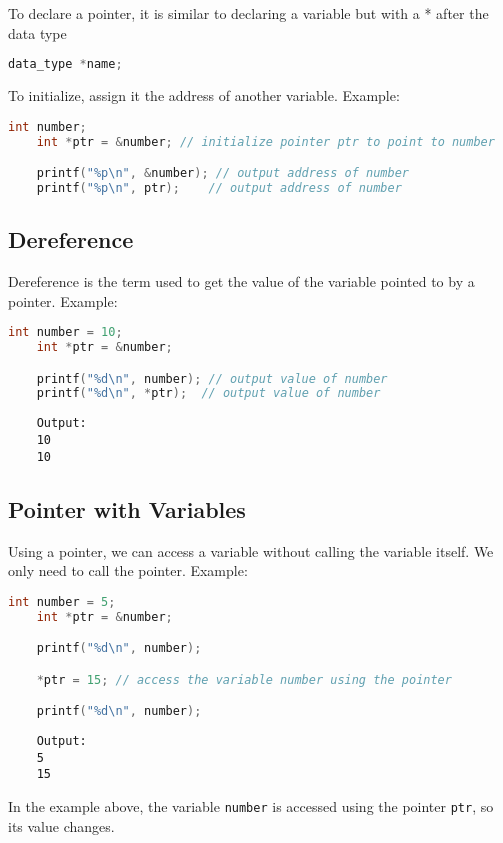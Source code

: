 To declare a pointer, it is similar to declaring a variable but with a * after the data type
{
\captionsetup[lstlisting]{labelformat=empty, justification=raggedright, singlelinecheck=false} %
\begin{lstlisting}[language=c, caption={Syntax}]
	data_type *name;
\end{lstlisting}
}
To initialize, assign it the address of another variable.
Example:
\begin{lstlisting}[language=c]
	int number;
	int *ptr = &number; // initialize pointer ptr to point to number

	printf("%p\n", &number); // output address of number
	printf("%p\n", ptr);    // output address of number
\end{lstlisting}

\subsection{Dereference}

Dereference is the term used to get the value of the variable pointed to by a pointer.
Example:
\begin{lstlisting}[language=c]
	int number = 10;
	int *ptr = &number;

	printf("%d\n", number); // output value of number
	printf("%d\n", *ptr);  // output value of number
\end{lstlisting}
\begin{verbatim}
	Output:
	10
	10
\end{verbatim}

\subsection{Pointer with Variables}

Using a pointer, we can access a variable without calling the variable itself.
We only need to call the pointer.
Example:
\begin{lstlisting}[language=c]
	int number = 5;
	int *ptr = &number;

	printf("%d\n", number);

	*ptr = 15; // access the variable number using the pointer

	printf("%d\n", number);  
\end{lstlisting}
\begin{verbatim}
    Output:
    5
    15
\end{verbatim}
In the example above, the variable \texttt{number} is accessed using the pointer \texttt{ptr}, so its value changes.

